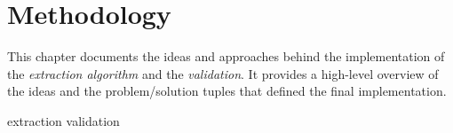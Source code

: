 \chapter{Methodology}

This chapter documents the ideas and approaches behind the implementation of the \textit{extraction algorithm} and the \textit{validation}. It provides a high-level overview of the ideas and the problem/solution tuples that defined the final implementation.

{extraction}
{validation}